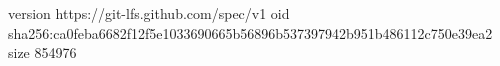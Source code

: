 version https://git-lfs.github.com/spec/v1
oid sha256:ca0feba6682f12f5e1033690665b56896b537397942b951b486112c750e39ea2
size 854976
